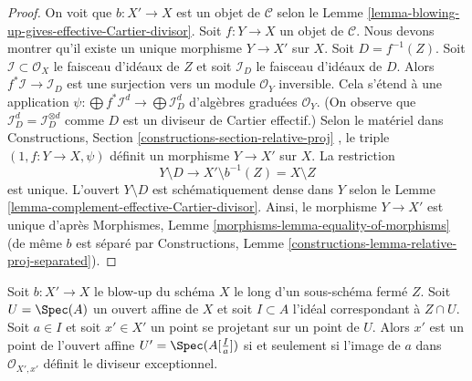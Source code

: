 \begin{proof}
On voit que  $b : X' \to X$  est un objet de  $\mathcal{C}$  selon le Lemme  \ref{lemma-blowing-up-gives-effective-Cartier-divisor}.
Soit  $f : Y \to X$  un objet de  $\mathcal{C}$. Nous devons montrer qu'il existe un
unique morphisme  $Y \to X'$  sur  $X$. Soit  $D = f^{-1}(Z)$. Soit
 $\mathcal{I} \subset \mathcal{O}_X$  le faisceau d'idéaux de  $Z$  et soit  $\mathcal{I}_D$  le faisceau
d'idéaux de  $D$. Alors  $f^*\mathcal{I} \to \mathcal{I}_D$  est une surjection vers un module
 $\mathcal{O}_Y$ inversible. Cela s'étend à une application  $\psi : \bigoplus f^*\mathcal{I}^d \to \bigoplus \mathcal{I}_D^d$  d'algèbres
graduées  $\mathcal{O}_Y$. (On observe que  $\mathcal{I}_D^d = \mathcal{I}_D^{\otimes d}$  comme  $D$  est un
diviseur de Cartier effectif.) Selon le matériel dans Constructions, Section
 \ref{constructions-section-relative-proj} , le triple  $(1, f : Y \to X, \psi)$  définit un morphisme  $Y \to X'$  sur
 $X$. La restriction
$$
Y \setminus D \longrightarrow X' \setminus b^{-1}(Z) = X \setminus Z
$$
est unique. L'ouvert  $Y \setminus D$  est schématiquement dense dans  $Y$ 
selon le Lemme  \ref{lemma-complement-effective-Cartier-divisor}. Ainsi, le morphisme  $Y \to X'$  est unique d'après
Morphismes, Lemme  \ref{morphisms-lemma-equality-of-morphisms}  (de même  $b$  est séparé par Constructions,
Lemme  \ref{constructions-lemma-relative-proj-separated}).
\end{proof}

\begin{lemma}
\label{lemma-characterize-affine-blowup}
Soit  $b : X' \to X$  le blow-up du schéma  $X$  le long d'un sous-schéma fermé
 $Z$. Soit  $U = \Spec(A)$  un ouvert affine de  $X$  et soit
 $I \subset A$  l'idéal correspondant à  $Z \cap U$. Soit  $a \in I$  et soit
 $x' \in X'$  un point se projetant sur un point de  $U$. Alors
 $x'$  est un point de l'ouvert affine  $U' = \Spec(A[\frac{I}{a}])$  si et seulement si
l'image de  $a$  dans  $\mathcal{O}_{X', x'}$  définit le diviseur exceptionnel.
\end{lemma}

